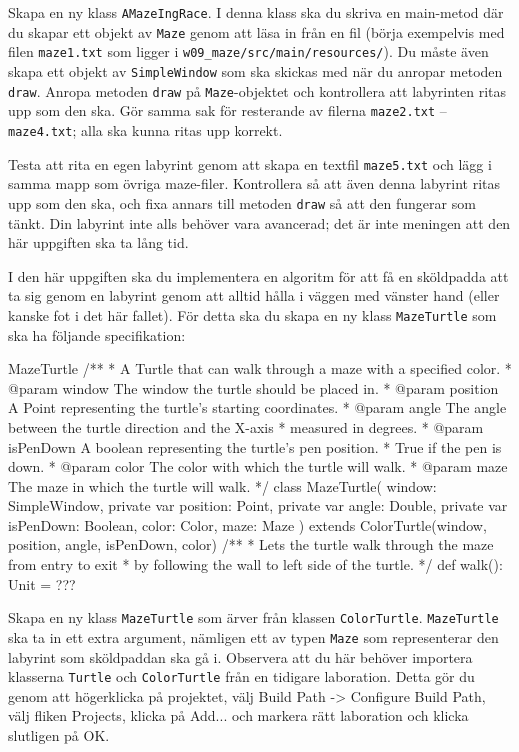 \Subtask Skapa en ny klass \texttt{AMazeIngRace}. I denna klass ska du skriva en main-metod där du skapar ett objekt av \texttt{Maze} genom att läsa in från en fil (börja exempelvis med filen \texttt{maze1.txt} som ligger i \texttt{w09\_maze/src/main/resources/}). Du måste även skapa ett objekt av \texttt{SimpleWindow} som ska skickas med när du anropar metoden \texttt{draw}. Anropa  metoden \texttt{draw} på \texttt{Maze}-objektet och kontrollera att labyrinten ritas upp som den ska. Gör samma sak för resterande av filerna \texttt{maze2.txt} -- \texttt{maze4.txt}; alla ska kunna ritas upp korrekt.

\Subtask Testa att rita en egen labyrint genom att skapa en textfil \texttt{maze5.txt} och lägg i samma mapp som övriga maze-filer. Kontrollera så att även denna labyrint ritas upp som den ska, och fixa annars till metoden \texttt{draw} så att den fungerar som tänkt. Din labyrint inte alls behöver vara avancerad; det är inte meningen att den här uppgiften ska ta lång tid.


\Task I den här uppgiften ska du implementera en algoritm för att få en sköldpadda att ta sig genom en labyrint genom att alltid hålla i väggen med vänster hand (eller kanske fot i det här fallet). För detta ska du skapa en ny klass \texttt{MazeTurtle} som ska ha följande specifikation:

\begin{ScalaSpec}{MazeTurtle}
/**
 * A Turtle that can walk through a maze with a specified color.
 * @param window    The window the turtle should be placed in.
 * @param position  A Point representing the turtle's starting coordinates.
 * @param angle     The angle between the turtle direction and the X-axis 
 *                  measured in degrees.
 * @param isPenDown A boolean representing the turtle's pen position. 
 *                  True if the pen is down.
 * @param color     The color with which the turtle will walk.
 * @param maze      The maze in which the turtle will walk.
 */
class MazeTurtle(
    window: SimpleWindow, 
    private var position: Point,
    private var angle: Double, 
    private var isPenDown: Boolean,
    color: Color, 
    maze: Maze
  ) extends ColorTurtle(window, position, angle, isPenDown, color) {
  /**
   * Lets the turtle walk through the maze from entry to exit 
   * by following the wall to left side of the turtle.
   */
  def walk(): Unit = ???
}

\end{ScalaSpec}

\Subtask Skapa en ny klass \texttt{MazeTurtle} som ärver från klassen \texttt{ColorTurtle}. \texttt{MazeTurtle} ska ta in ett extra argument, nämligen ett av typen \texttt{Maze} som representerar den labyrint som sköldpaddan ska gå i. Observera att du här behöver importera klasserna \texttt{Turtle} och \texttt{ColorTurtle} från en tidigare laboration. Detta gör du genom att högerklicka på projektet, välj Build Path -> Configure Build Path, välj fliken Projects, klicka på Add... och markera rätt laboration och klicka slutligen på OK.

